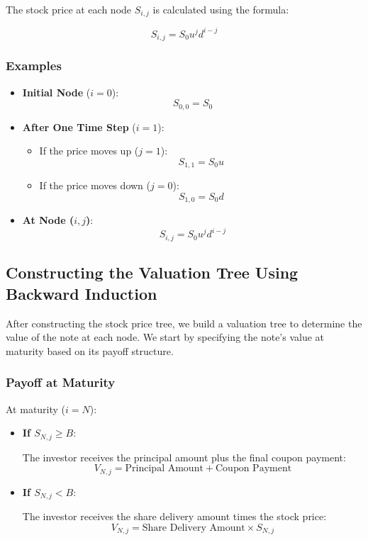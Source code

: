 \documentclass[12pt,a4paper]{article}
\begin{document}
The stock price at each node \( S_{i,j} \) is calculated using the formula:

\[
S_{i,j} = S_0 u^j d^{i - j}
\]

\subsubsection*{Examples}

\begin{itemize}
    \item \textbf{Initial Node} (\( i = 0 \)):
    \[
    S_{0,0} = S_0
    \]
    \item \textbf{After One Time Step} (\( i = 1 \)):
    \begin{itemize}
        \item If the price moves up (\( j = 1 \)):
        \[
        S_{1,1} = S_0 u
        \]
        \item If the price moves down (\( j = 0 \)):
        \[
        S_{1,0} = S_0 d
        \]
    \end{itemize}
    \item \textbf{At Node (\( i, j \))}:
    \[
    S_{i,j} = S_0 u^j d^{i - j}
    \]
\end{itemize}


\subsection*{Constructing the Valuation Tree Using Backward Induction}

After constructing the stock price tree, we build a valuation tree to determine the value of the note at each node. We start by specifying the note's value at maturity based on its payoff structure.

\subsubsection*{Payoff at Maturity}

At maturity (\( i = N \)):

\begin{itemize}
    \item \textbf{If \( S_{N,j} \geq B \)}:

    The investor receives the principal amount plus the final coupon payment:
    \[
    V_{N,j} = \text{Principal Amount} + \text{Coupon Payment}
    \]

    \item \textbf{If \( S_{N,j} < B \)}:

    The investor receives the share delivery amount times the stock price:
    \[
    V_{N,j} = \text{Share Delivery Amount} \times S_{N,j}
    \]
\end{itemize}
\end{document}
